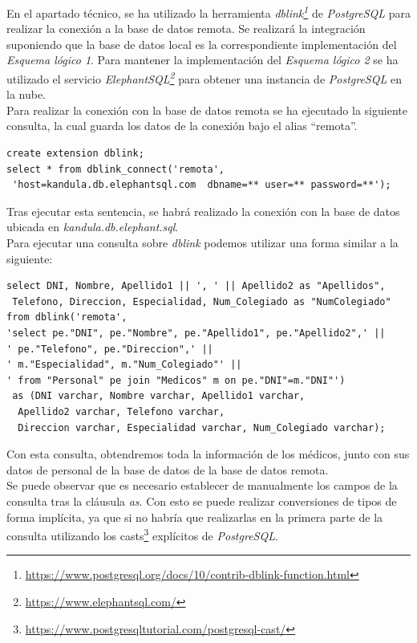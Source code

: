 \documentclass{article}
\begin{document}
En el apartado técnico, se ha utilizado la herramienta \emph{dblink\footnote{\url{https://www.postgresql.org/docs/10/contrib-dblink-function.html}}} de \emph{PostgreSQL} para realizar la conexión a la base de datos remota. Se realizará la integración suponiendo que la base de datos local es la correspondiente implementación del \emph{Esquema lógico 1}. Para mantener la implementación del \emph{Esquema lógico 2} se ha utilizado el servicio \emph{ElephantSQL\footnote{\url{https://www.elephantsql.com/}}} para obtener una instancia de \emph{PostgreSQL} en la nube.\\
Para realizar la conexión con la base de datos remota se ha ejecutado la siguiente consulta, la cual guarda los datos de la conexión bajo el alias ``remota''.

\begin{lstlisting}
create extension dblink;
select * from dblink_connect('remota',
 'host=kandula.db.elephantsql.com  dbname=** user=** password=**');
\end{lstlisting}

Tras ejecutar esta sentencia, se habrá realizado la conexión con la base de datos ubicada en \emph{kandula.db.elephant.sql}.\\
Para ejecutar una consulta sobre \emph{dblink} podemos utilizar una forma similar a la siguiente:

\begin{lstlisting}
select DNI, Nombre, Apellido1 || ', ' || Apellido2 as "Apellidos",
 Telefono, Direccion, Especialidad, Num_Colegiado as "NumColegiado"
from dblink('remota', 
'select pe."DNI", pe."Nombre", pe."Apellido1", pe."Apellido2",' || 
' pe."Telefono", pe."Direccion",' || 
' m."Especialidad", m."Num_Colegiado"' ||
' from "Personal" pe join "Medicos" m on pe."DNI"=m."DNI"') 
 as (DNI varchar, Nombre varchar, Apellido1 varchar,
  Apellido2 varchar, Telefono varchar,
  Direccion varchar, Especialidad varchar, Num_Colegiado varchar);
\end{lstlisting}

Con esta consulta, obtendremos toda la información de los médicos, junto con sus datos de personal de la base de datos de la base de datos remota.\\
Se puede observar que es necesario establecer de manualmente los campos de la consulta tras la cláusula \emph{as}. Con esto se puede realizar conversiones de tipos de forma implícita, ya que si no habría que realizarlas en la primera parte de la consulta utilizando los casts\footnote{\url{https://www.postgresqltutorial.com/postgresql-cast/}} explícitos de \emph{PostgreSQL}.\\
\end{document}
